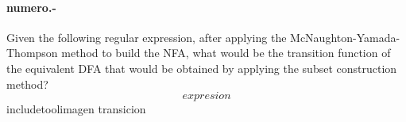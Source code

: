 

\paragraph{{numero}.-}\label{p{numero}}
Given the following regular expression, after applying the McNaughton-Yamada-Thompson method to build the NFA, what would be the transition function of the equivalent DFA that would be obtained by applying the subset construction method?
\[
    {expresion}
\]
{includetool}{{imagen}}
{transicion}
